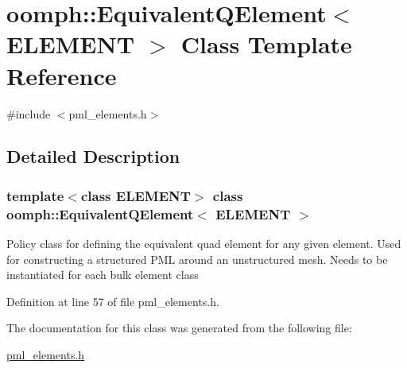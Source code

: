 \hypertarget{classoomph_1_1EquivalentQElement}{}\section{oomph\+:\+:Equivalent\+Q\+Element$<$ E\+L\+E\+M\+E\+NT $>$ Class Template Reference}
\label{classoomph_1_1EquivalentQElement}


{\ttfamily \#include $<$pml\+\_\+elements.\+h$>$}



\subsection{Detailed Description}
\subsubsection*{template$<$class E\+L\+E\+M\+E\+NT$>$\newline
class oomph\+::\+Equivalent\+Q\+Element$<$ E\+L\+E\+M\+E\+N\+T $>$}

Policy class for defining the equivalent quad element for any given element. Used for constructing a structured P\+ML around an unstructured mesh. Needs to be instantiated for each bulk element class 

Definition at line 57 of file pml\+\_\+elements.\+h.



The documentation for this class was generated from the following file\+:\begin{DoxyCompactItemize}
\item 
\hyperlink{pml__elements_8h}{pml\+\_\+elements.\+h}\end{DoxyCompactItemize}
